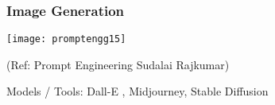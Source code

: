 
		






		







		



\begin{frame}[fragile]\frametitle{Image Generation}

\begin{center}
\texttt{[image: promptengg15]}

{\tiny (Ref: Prompt Engineering Sudalai Rajkumar)}

\end{center}		
		
		
Models / Tools: Dall-E , Midjourney, Stable Diffusion



\end{frame}


